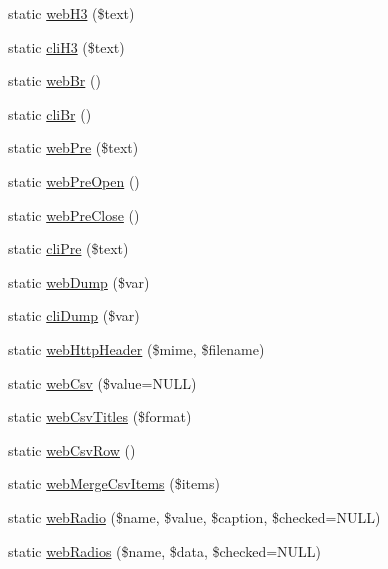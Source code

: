 \begin{DoxyCompactItemize}
\item 
static \hyperlink{classCinisisDisplayHelper_acc20c726a214895584d15a434b2f3548}{webH3} (\$text)
\item 
static \hyperlink{classCinisisDisplayHelper_a1ed9ee357ffda8e2efd885a6eae20550}{cliH3} (\$text)
\item 
static \hyperlink{classCinisisDisplayHelper_a9c8b637e47e4263901baf4c5f2064d8d}{webBr} ()
\item 
static \hyperlink{classCinisisDisplayHelper_ad61db99c9d639678c96879aa34288323}{cliBr} ()
\item 
static \hyperlink{classCinisisDisplayHelper_a528283a8b16090918f1878dca5ee24fb}{webPre} (\$text)
\item 
static \hyperlink{classCinisisDisplayHelper_a9c2a28e3865e8b3950b428770a132aa0}{webPreOpen} ()
\item 
static \hyperlink{classCinisisDisplayHelper_af4d61af3ed8211300032a208175d72ed}{webPreClose} ()
\item 
static \hyperlink{classCinisisDisplayHelper_a50bf73bd3722766cbae1b46b3092453d}{cliPre} (\$text)
\item 
static \hyperlink{classCinisisDisplayHelper_a7811830062abc85b90cf391a9ff89fdf}{webDump} (\$var)
\item 
static \hyperlink{classCinisisDisplayHelper_abd525c7b612f9dce348bb1479470b445}{cliDump} (\$var)
\item 
static \hyperlink{classCinisisDisplayHelper_a6629bfa4b0ccd26d1433ca2302ce8c41}{webHttpHeader} (\$mime, \$filename)
\item 
static \hyperlink{classCinisisDisplayHelper_a0155226dc341e71cf2d32a7611a6402b}{webCsv} (\$value=NULL)
\item 
static \hyperlink{classCinisisDisplayHelper_ae15e846c353078222ee061a835c8c0f8}{webCsvTitles} (\$format)
\item 
static \hyperlink{classCinisisDisplayHelper_aa020ea03001524e4e437069f08ba8e26}{webCsvRow} ()
\item 
static \hyperlink{classCinisisDisplayHelper_a6e04da665f31a88eb3c42579d266bd4f}{webMergeCsvItems} (\$items)
\item 
static \hyperlink{classCinisisDisplayHelper_abd8110a9976bb72b42992b28b5aae80d}{webRadio} (\$name, \$value, \$caption, \$checked=NULL)
\item 
static \hyperlink{classCinisisDisplayHelper_ac8c66caf42859ab8308aa40dfa33dbd0}{webRadios} (\$name, \$data, \$checked=NULL)
\end{DoxyCompactItemize}


